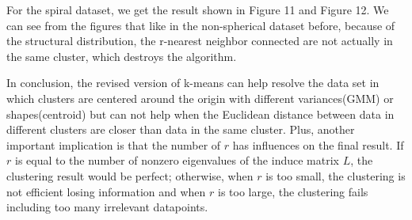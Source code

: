\documentclass[]{homework}
\begin{document}
For the spiral dataset, we get the result shown in Figure 11 and Figure 12. We can see from the figures that like in the non-spherical dataset before, because of the structural distribution, the r-nearest neighbor connected are not actually in the same cluster, which destroys the algorithm.

In conclusion, the revised version of k-means can help resolve the data set in which clusters are centered around the origin with different variances(GMM) or shapes(centroid) but can not help when the Euclidean distance between data in different clusters are closer than data in the same cluster. Plus, another important implication is that the number of $r$ has influences on the final result. If $r$ is equal to the number of nonzero eigenvalues of the induce matrix $L$, the clustering result would be perfect; otherwise, when $r$ is too small, the clustering is not efficient losing information and when $r$ is too large, the clustering fails including too many irrelevant datapoints.
\end{document}
